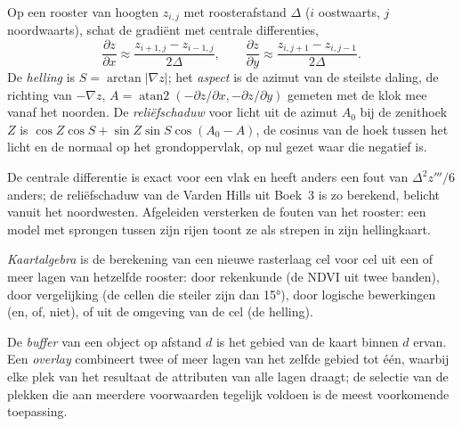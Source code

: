 \begin{method}\label{met:b3:remote-sensing-gis:slope}
Op een rooster van hoogten $z_{i,j}$ met roosterafstand $\Delta$ ($i$ oostwaarts, $j$
noordwaarts), schat de gradiënt met centrale differenties,
\[
\frac{\partial z}{\partial x} \approx \frac{z_{i+1,j} - z_{i-1,j}}{2\Delta} ,
\qquad
\frac{\partial z}{\partial y} \approx \frac{z_{i,j+1} - z_{i,j-1}}{2\Delta} .
\]
De \emph{helling} is $S = \arctan|\nabla z|$; het \emph{aspect} is de
azimut van de steilste daling, de richting van $-\nabla z$, $A =
\operatorname{atan2}(-\partial z/\partial x, -\partial z/\partial y)$
gemeten met de klok mee vanaf het noorden. De \emph{reliëfschaduw} voor licht uit de
azimut $A_0$ bij de zenithoek $Z$ is $\cos Z\cos S + \sin Z\sin S
\cos(A_0 - A)$, de cosinus van de hoek tussen het licht en de normaal
op het grondoppervlak, op nul gezet waar die negatief is.
\end{method}

De centrale differentie is exact voor een vlak en heeft anders een fout van
$\Delta^2 z'''/6$ anders; de reliëfschaduw van de Varden Hills uit
Boek~3 is zo berekend, belicht vanuit het noordwesten. Afgeleiden
versterken de fouten van het rooster: een model met sprongen tussen zijn rijen toont
ze als strepen in zijn hellingkaart.

\begin{definition}[Kaartalgebra]\label{def:b3:remote-sensing-gis:map-algebra}
\emph{Kaartalgebra} is de berekening van een nieuwe rasterlaag
cel voor cel uit een of meer lagen van hetzelfde rooster: door rekenkunde
(de NDVI uit twee banden), door vergelijking (de cellen die steiler zijn dan
\ang{15}), door logische bewerkingen (en, of, niet), of uit de omgeving
van de cel (de helling).
\end{definition}

\begin{definition}\label{def:b3:remote-sensing-gis:operations}
De \emph{buffer} van een object op afstand $d$ is
het gebied van de kaart binnen $d$ ervan. Een
\emph{overlay} combineert twee of meer lagen van het
zelfde gebied tot één, waarbij elke plek van het resultaat de attributen van
alle lagen draagt; de selectie van de plekken die aan meerdere voorwaarden tegelijk voldoen
is de meest voorkomende toepassing.
\end{definition}

